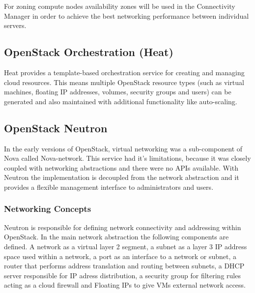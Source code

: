 For zoning compute nodes availability zones will be used in the Connectivity Manager in order to achieve the best networking performance between individual servers.


\subsection{OpenStack Orchestration (Heat)}

Heat provides a template-based orchestration service for creating and managing cloud resources. This means multiple OpenStack resource types (such as virtual machines, floating IP addresses, volumes, security groups and users) can be generated and also maintained with additional functionality like auto-scaling.



\subsection{OpenStack Neutron}

In the early versions of OpenStack, virtual networking was a sub-component of Nova called Nova-network. This service had it's limitations, because it was closely coupled with networking abstractions and there were no APIs available. With Neutron the implementation is decoupled from the network abstraction and it provides a flexible management interface to administrators and users.


\subsubsection{Networking Concepts}


Neutron is responsible for defining network connectivity and addressing within OpenStack. In the main network abstraction the following components are defined. A network as a virtual layer 2 segment, a subnet as a layer 3 IP address space used within a network, a port as an interface to a network or subnet, a router that performs address translation and routing between subnets, a DHCP server responsible for IP adress distribution, a security group for filtering rules acting as a cloud firewall and Floating IPs to give VMs external network access.

